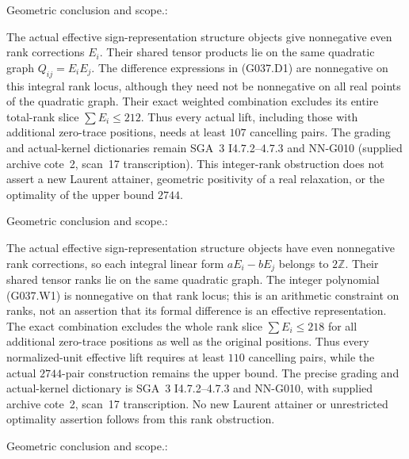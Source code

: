 \begin{geometricstatement}[NN-G037]
Geometric conclusion and scope.:

The actual effective sign-representation structure objects give
nonnegative even rank corrections $E_i$.  Their shared tensor
products lie on the same quadratic graph $Q_{ij}=E_iE_j$.
The difference expressions in (G037.D1) are nonnegative on this
integral rank locus, although they need not be nonnegative on
all real points of the quadratic graph.  Their exact weighted
combination excludes its entire total-rank slice
$\sum E_i\le212$.  Thus every actual lift, including those with
additional zero-trace positions, needs at least $107$ cancelling
pairs.  The grading and actual-kernel dictionaries remain
SGA~3 I4.7.2--4.7.3 and NN-G010 (supplied archive cote~2,
scan~17 transcription).  This integer-rank obstruction does not
assert a new Laurent attainer, geometric positivity of a real
relaxation, or the optimality of the upper bound $2744$.



Geometric conclusion and scope.:

The actual effective sign-representation structure objects have
even nonnegative rank corrections, so each integral linear form
$aE_i-bE_j$ belongs to $2\mathbb Z$.  Their shared tensor ranks
lie on the same quadratic graph.  The integer polynomial
(G037.W1) is nonnegative on that rank locus; this is an arithmetic
constraint on ranks, not an assertion that its formal difference
is an effective representation.  The exact combination excludes
the whole rank slice $\sum E_i\le218$ for all additional
zero-trace positions as well as the original positions.  Thus
every normalized-unit effective lift requires at least $110$
cancelling pairs, while the actual $2744$-pair construction remains
the upper bound.  The precise grading and actual-kernel dictionary
is SGA~3 I4.7.2--4.7.3 and NN-G010, with supplied archive cote~2,
scan~17 transcription.  No new Laurent attainer or unrestricted
optimality assertion follows from this rank obstruction.



Geometric conclusion and scope.:


\end{geometricstatement}
